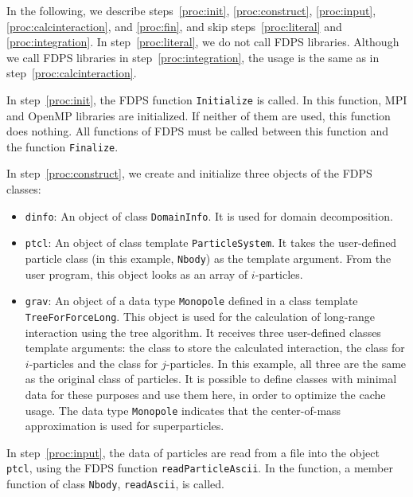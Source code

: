 In the following, we describe  steps~\ref{proc:init},
\ref{proc:construct}, \ref{proc:input}, \ref{proc:calcinteraction},
and \ref{proc:fin}, and skip steps~\ref{proc:literal}
and \ref{proc:integration}.  In step~\ref{proc:literal}, we do not
call FDPS libraries.  Although we call FDPS libraries in
step~\ref{proc:integration}, the usage is the same as in
step~\ref{proc:calcinteraction}.

In step~\ref{proc:init}, the FDPS function \texttt{Initialize} is
called. In this function, MPI and OpenMP libraries are initialized. If
neither of them are used, this function does nothing.  All functions
of FDPS must be called between this function and the
function \texttt{Finalize}.

In step~\ref{proc:construct}, we create and initialize three objects
of the FDPS classes:
\begin{itemize}
\item \texttt{dinfo}: An object of class \texttt{DomainInfo}. It is
  used for domain decomposition.
\item \texttt{ptcl}: An object of class template \texttt{ParticleSystem}.
It takes the user-defined particle class (in this
example, \texttt{Nbody}) as the template argument. From the user
program, this object looks as an array of $i$-particles.
\item \texttt{grav}: An object of a data type \texttt{Monopole} defined in
a class template \texttt{TreeForForceLong}. This object is used for
the calculation of long-range interaction using the tree algorithm.
It receives three user-defined classes template arguments: the class
to store the calculated interaction, the class for $i$-particles and
the class for $j$-particles. In this example, all three are the same
as the original class of particles.  It is possible to define classes
with minimal data for these purposes and use them here, in order to
optimize the cache usage. The data type \texttt{Monopole} indicates
that the center-of-mass approximation is used for superparticles.
\end{itemize}

In step~\ref{proc:input}, the data of particles are read from a file
into the object \texttt{ptcl}, using the FDPS
function \texttt{readParticleAscii}. In the function, a member
function of class \texttt{Nbody}, \texttt{readAscii}, is called.

